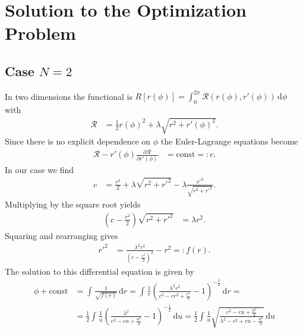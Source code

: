 \documentclass[english, parskip=full]{scrartcl}
\newcommand{\intx}{}
\newcommand{\kla}{}
\newcommand{\tecxt}{}
\begin{document}
\section{Solution to the Optimization Problem}
\subsection{Case $N=2$}
In two dimensions the functional is $R[r(\phi)] = \intx\int_{0}^{2\pi} \mathcal{R}(r(\phi), r'(\phi)) \, \mathrm{d}\phi$ with
\begin{align}
\mathcal{R} &= \frac{1}{2} r(\phi)^2 + \lambda\sqrt{r^2 + r'(\phi)^2}.
\end{align}
Since there is no explicit dependence on $\phi$ the Euler-Lagrange equations become
\begin{align}
\mathcal{R} - r'(\phi) \frac{\partial \mathcal{R}}{\partial r'(\phi)} &= \tecxt\text{const} =: c.
\end{align}
In our case we find
\begin{align}
c &= \frac{r^2}{2} + \lambda\sqrt{r^2 + r'^2} - \lambda \frac{r'^2}{\sqrt{r^2 + r'^2}}.
\end{align}
Multiplying by the square root yields
\begin{align}
\kla\left( c - \frac{r^2}{2} \right) \sqrt{ r^2 + r'^2 } &= \lambda r^2.
\end{align}
Squaring and rearranging gives
\begin{align}
r'^2 &= \frac{\lambda^2 r^4}{\kla\left( c - \frac{r^2}{2} \right)^2} - r^2 =: f(r).
\end{align}
The solution to this differential equation is given by 
\begin{align}
\phi + \tecxt\text{const} &= \intx\int_{ }^{ } \frac{1}{\sqrt{f(r)}} \, \mathrm{d}r = \intx\int_{ }^{ } \frac{1}{r} \kla\left( \frac{\lambda^2r^2}{c^2 - cr^2 + \frac{r^4}{4}} - 1 \right)^{-\frac{1}{2}} \, \mathrm{d}r = \\
&= \frac{1}{2} \intx\int_{ }^{ } \frac{1}{u} \kla\left( \frac{\lambda^2}{c^2 - cu + \frac{u^2}{4}} - 1 \right)^{-\frac{1}{2}} \, \mathrm{d}u = \frac{1}{2} \intx\int_{ }^{ } \frac{1}{u} \sqrt{\frac{c^2 - cu + \frac{u^2}{4}}{\lambda^2 - c^2 + cu - \frac{u^2}{4}}} \, \mathrm{d}u
\end{align}



\end{document}
